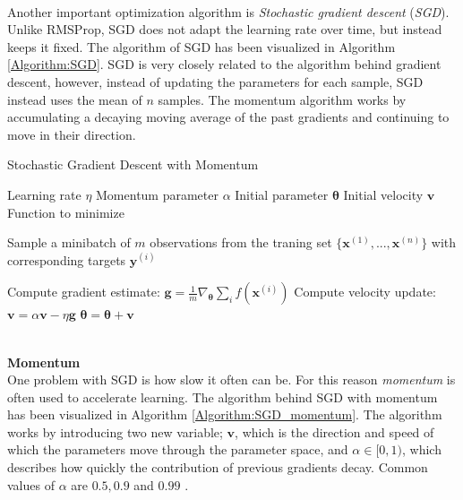 \documentclass[./main.tex]{subfiles}
\begin{document}
\\
Another important optimization algorithm is \textit{Stochastic gradient descent} (\textit{SGD}). Unlike RMSProp, SGD does not adapt the learning rate over time, but instead keeps it fixed. The algorithm of SGD has been visualized in Algorithm \ref{Algorithm:SGD}. SGD is very closely related to the algorithm behind gradient descent, however, instead of updating the parameters for each sample, SGD instead uses the mean of $n$ samples. The momentum algorithm works by accumulating a decaying moving average of the past gradients and continuing to move in their direction. 
\\
\begin{algorithm}[htbp]
    \caption{Stochastic Gradient Descent with Momentum \cite{DeepLearning}}
    \label{Algorithm:SGD_momentum}
    \begin{algorithmic}[1]
        \Require Learning rate $\eta$
        \Require Momentum parameter $\alpha$
        \Require Initial parameter $\bm{\theta}$
        \Require Initial velocity $\bm{v}$
        \Require Function to minimize
            \State \begin{varwidth}[t]{\linewidth}
            Sample a minibatch of $m$ observations from the traning set $\{\bm{x}^{(1)}, ..., \bm{x}^{(n)}\}$ with corresponding targets $\bm{y}^{(i)}$
            \end{varwidth} 
            \State Compute gradient estimate: $\bm{g} = \frac{1}{m} \nabla_{\bm{\theta}} \sum_i f \left( \bm{x}^{(i)} \right)$
            \State Compute velocity update: $\bm{v} = \alpha \bm{v} - \eta \bm{g}$
            \State $\bm{\theta} = \bm{\theta} + \bm{v}$
        \EndWhile
    \end{algorithmic}
\end{algorithm}
\\
\textbf{Momentum} \\
One problem with SGD is how slow it often can be. For this reason \textit{momentum} is often used to accelerate learning. The algorithm behind SGD with momentum has been visualized in Algorithm \ref{Algorithm:SGD_momentum}. The algorithm works by introducing two new variable; $\bm{v}$, which is the direction and speed of which the parameters move through the parameter space, and $\alpha \in [0, 1)$, which describes how quickly the contribution of previous gradients decay. Common values of $\alpha$ are $0.5, 0.9$ and $0.99$ \cite{DeepLearning}. 
\\
\\
\end{document}
